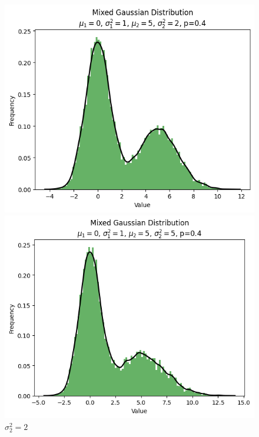 \documentclass{article}
\begin{document}
\begin{figure}[H]
\begin{minipage}[b]{0.3\linewidth}
        \caption{$\sigma_2^2=0.5$}
    \end{minipage}
    \hfill
    \begin{minipage}[b]{0.3\linewidth}
        \centering
        \includegraphics[width=\linewidth]{figure/sigma_^2=2.png}
        \caption{$\sigma_2^2=2$}
    \end{minipage}
    \vspace{4mm} %
    \begin{minipage}[b]{0.3\linewidth}
        \centering
        \includegraphics[width=\linewidth]{figure/sigma_^2=5.png}

\end{minipage}
\end{figure}
\end{document}
